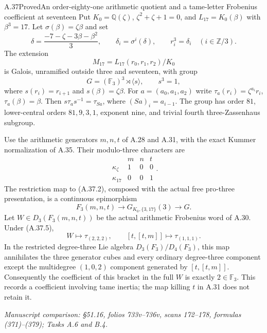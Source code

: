 \begin{statement}{A.37}{Proved}{An order-eighty-one arithmetic quotient and a tame-letter Frobenius coefficient at seventeen}
Put $K_0=\mathbb Q(\zeta)$, $\zeta^2+\zeta+1=0$, and
$L_{17}=K_0(\beta)$ with $\beta^3=17$. Let
$\sigma(\beta)=\zeta\beta$ and set
\[
 \delta=\frac{-7-\zeta-3\beta-\beta^2}{3},\qquad
 \delta_i=\sigma^i(\delta),\qquad
 r_i^3=\delta_i\quad(i\in\mathbb Z/3).
 \tag{A.37.1}
\]
The extension
\[
 M_{17}=L_{17}(r_0,r_1,r_2)/K_0
 \tag{A.37.2}
\]
is Galois, unramified outside three and seventeen, with group
\[
 G=(\mathbb F_3)^3\rtimes\langle s\rangle,
 \qquad s^3=1,
 \tag{A.37.3}
\]
where $s(r_i)=r_{i+1}$ and $s(\beta)=\zeta\beta$.
For $a=(a_0,a_1,a_2)$ write
$\tau_a(r_i)=\zeta^{a_i}r_i$, $\tau_a(\beta)=\beta$.
Then
$s\tau_as^{-1}=\tau_{Sa}$, where $(Sa)_i=a_{i-1}$.
The group has order $81$, lower-central orders
$81,9,3,1$, exponent nine, and trivial fourth
three-Zassenhaus subgroup.

Use the arithmetic generators $m,n,t$ of A.28 and A.31,
with the exact Kummer normalization of A.35. Their
modulo-three characters are
\[
 \begin{array}{c|ccc}
       &m&n&t\\\hline
 \kappa_\zeta&1&0&0\\
 \kappa_{17}&0&0&1
 \end{array}.
 \tag{A.37.4}
\]
The restriction map to (A.37.2), composed with the
actual free pro-three presentation, is a continuous
epimorphism
\[
 F_3(m,n,t)\longrightarrow
 G_{K_0,\{3,17\}}(3)\longrightarrow G.
 \tag{A.37.5}
\]
Let $W\in D_3(F_3(m,n,t))$ be the actual arithmetic
Frobenius word of A.30. Under (A.37.5),
\[
 W\longmapsto\tau_{(2,2,2)},\qquad
 [t,[t,m]]\longmapsto\tau_{(1,1,1)}.
 \tag{A.37.6}
\]
In the restricted degree-three Lie algebra
$D_3(F_3)/D_4(F_3)$, this map annihilates the three
generator cubes and every ordinary degree-three
component except the multidegree $(1,0,2)$ component
generated by $[t,[t,m]]$. Consequently the coefficient
of this bracket in the full $W$ is exactly $2\in\mathbb F_3$.
This records a coefficient involving tame inertia;
the map killing $t$ in A.31 does not retain it.
\par\smallskip\noindent\emph{Manuscript comparison:
\S51.16, folios 733v--736v, scans 172--178,
formulas (371)--(379); Tasks A.6 and B.4.}
\end{statement}
